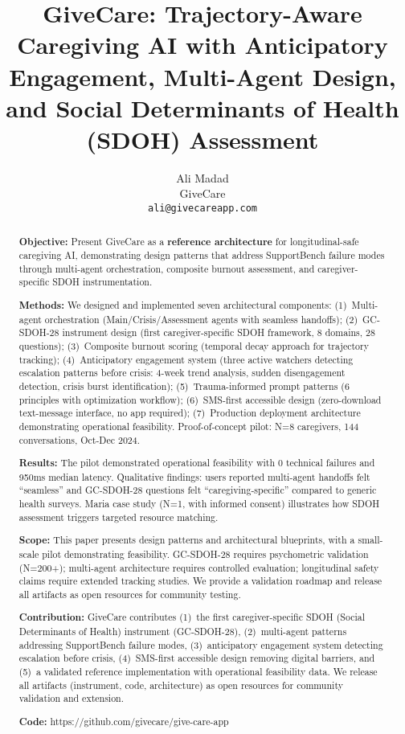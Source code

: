 \documentclass{article}
\title{GiveCare: Trajectory-Aware Caregiving AI with Anticipatory Engagement, Multi-Agent Design, and Social Determinants of Health (SDOH) Assessment}
\author{
  Ali Madad \\
  GiveCare \\
  \texttt{ali@givecareapp.com}
}
\begin{document}
%
\maketitle%
\begin{abstract}%
\textbf{Objective:} Present GiveCare as a \textbf{reference architecture} for longitudinal-safe caregiving AI, demonstrating design patterns that address SupportBench failure modes through multi-agent orchestration, composite burnout assessment, and caregiver-specific SDOH instrumentation.

\textbf{Methods:} We designed and implemented seven architectural components: (1)~Multi-agent orchestration (Main/Crisis/Assessment agents with seamless handoffs); (2)~GC-SDOH-28 instrument design (first caregiver-specific SDOH framework, 8 domains, 28 questions); (3)~Composite burnout scoring (temporal decay approach for trajectory tracking); (4)~Anticipatory engagement system (three active watchers detecting escalation patterns before crisis: 4-week trend analysis, sudden disengagement detection, crisis burst identification); (5)~Trauma-informed prompt patterns (6 principles with optimization workflow); (6)~SMS-first accessible design (zero-download text-message interface, no app required); (7)~Production deployment architecture demonstrating operational feasibility. Proof-of-concept pilot: N=8 caregivers, 144 conversations, Oct-Dec 2024.

\textbf{Results:} The pilot demonstrated operational feasibility with 0 technical failures and 950ms median latency. Qualitative findings: users reported multi-agent handoffs felt ``seamless'' and GC-SDOH-28 questions felt ``caregiving-specific'' compared to generic health surveys. Maria case study (N=1, with informed consent) illustrates how SDOH assessment triggers targeted resource matching.

\textbf{Scope:} This paper presents design patterns and architectural blueprints, with a small-scale pilot demonstrating feasibility. GC-SDOH-28 requires psychometric validation (N=200+); multi-agent architecture requires controlled evaluation; longitudinal safety claims require extended tracking studies. We provide a validation roadmap and release all artifacts as open resources for community testing.

\textbf{Contribution:} GiveCare contributes (1)~the first caregiver-specific SDOH (Social Determinants of Health) instrument (GC-SDOH-28), (2)~multi-agent patterns addressing SupportBench failure modes, (3)~anticipatory engagement system detecting escalation before crisis, (4)~SMS-first accessible design removing digital barriers, and (5)~a validated reference implementation with operational feasibility data. We release all artifacts (instrument, code, architecture) as open resources for community validation and extension.

\textbf{Code:} https://github.com/givecare/give-care-app%
\end{abstract}%
\end{document}
